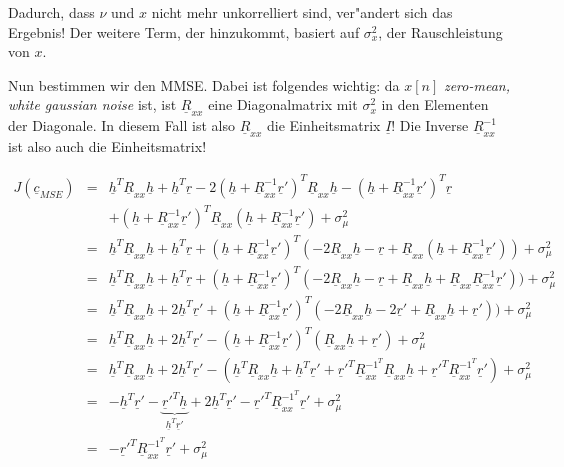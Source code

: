 Dadurch, dass $\nu$ und $x$ nicht mehr unkorrelliert sind, ver"andert sich das Ergebnis! Der weitere Term, der hinzukommt, basiert auf $\sigma_x^2$, der Rauschleistung von $x$.

Nun bestimmen wir den MMSE. Dabei ist folgendes wichtig: da $x[n]$ \emph{zero-mean, white gaussian noise} ist, ist $\underline{R}_{xx}$ eine Diagonalmatrix mit $\sigma_x^2$ in den Elementen der Diagonale. In diesem Fall ist also $\underline{R}_{xx}$ die Einheitsmatrix $\underline{I}$! Die Inverse $\underline{R}_{xx}^{-1}$ ist also auch die Einheitsmatrix!

\begin{eqnarray}
	J(\underline{c}_{MSE}) & = & \underline{h}^T \underline{R}_{xx} \underline{h} + \underline{h}^T \underline{r} - 2 (\underline{h} + \underline{R}_{xx}^{-1} \underline{r}')^T  \underline{R}_{xx} \underline{h} - (\underline{h} + \underline{R}_{xx}^{-1} \underline{r}')^T \underline{r} \\
	& & + (\underline{h} + \underline{R}_{xx}^{-1} \underline{r}')^T \underline{R}_{xx} (\underline{h} + \underline{R}_{xx}^{-1} \underline{r}') + \sigma_\mu^2 \\
	& = & \underline{h}^T \underline{R}_{xx} \underline{h} + \underline{h}^T \underline{r} + (\underline{h} + \underline{R}_{xx}^{-1} \underline{r}')^T (-2 \underline{R}_{xx} \underline{h}  - \underline{r} + \underline{R}_{xx} (\underline{h} + \underline{R}_{xx}^{-1} \underline{r}')) + \sigma_\mu^2 \\
	& = & \underline{h}^T \underline{R}_{xx} \underline{h} + \underline{h}^T \underline{r} + (\underline{h} + \underline{R}_{xx}^{-1} \underline{r}')^T (-2 \underline{R}_{xx} \underline{h}  - \underline{r} + \underline{R}_{xx} \underline{h} + \underline{R}_{xx} \underline{R}_{xx}^{-1} \underline{r}')) + \sigma_\mu^2 \\
	& = & \underline{h}^T \underline{R}_{xx} \underline{h} + 2 \underline{h}^T \underline{r}' + (\underline{h} + \underline{R}_{xx}^{-1} \underline{r}')^T (-2 \underline{R}_{xx} \underline{h}  - 2 \underline{r}' + \underline{R}_{xx} \underline{h} + \underline{r}')) + \sigma_\mu^2 \\
	& = & \underline{h}^T \underline{R}_{xx} \underline{h} + 2 \underline{h}^T \underline{r}' - (\underline{h} + \underline{R}_{xx}^{-1} \underline{r}')^T (\underline{R}_{xx} \underline{h} + \underline{r}') + \sigma_\mu^2 \\
	& = & \underline{h}^T \underline{R}_{xx} \underline{h} + 2 \underline{h}^T \underline{r}' - (\underline{h}^T \underline{R}_{xx} \underline{h} + \underline{h}^T \underline{r}' + \underline{r}'^T \underline{R}_{xx}^{-1^T} \underline{R}_{xx} \underline{h} + \underline{r}'^T \underline{R}_{xx}^{-1^T} \underline{r}' ) + \sigma_\mu^2 \\
	& = & - \underline{h}^T \underline{r}' - \underbrace{\underline{r}'^T \underline{h}}_{\underline{h}^T \underline{r}'} + 2 \underline{h}^T \underline{r}' - \underline{r}'^T \underline{R}_{xx}^{-1^T} \underline{r}' + \sigma_\mu^2 \\
	& = & - \underline{r}'^T \underline{R}_{xx}^{-1^T} \underline{r}' + \sigma_\mu^2
\end{eqnarray}

